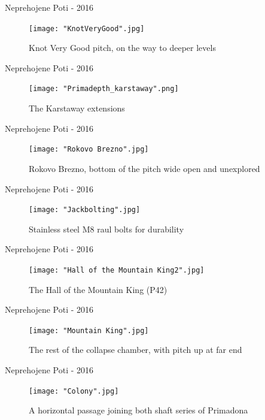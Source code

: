 \documentclass[10pt]{beamer}
\begin{document}
\begin{frame}{Neprehojene Poti - 2016}
    \begin{figure}[!ht]
    \centering
    \texttt{[image: "KnotVeryGood".jpg]}
    \caption{Knot Very Good pitch, on the way to deeper levels}
    \end{figure}
\end{frame} 

\begin{frame}{Neprehojene Poti - 2016}
    \begin{figure}[!ht]
    \centering
    \texttt{[image: "Primadepth\_karstaway".png]}
    \caption{The Karstaway extensions}
    \end{figure}
\end{frame} 
\begin{frame}{Neprehojene Poti - 2016}
    \begin{figure}[!ht]
    \centering
    \texttt{[image: "Rokovo Brezno".jpg]}
    \caption{Rokovo Brezno, bottom of the pitch wide open and unexplored}
    \end{figure}
\end{frame} 

    \begin{frame}{Neprehojene Poti - 2016}
    \begin{figure}[!ht]
    \centering
    \texttt{[image: "Jackbolting".jpg]}
    \caption{Stainless steel M8 raul bolts for durability}
    \end{figure}
\end{frame} 

\begin{frame}{Neprehojene Poti - 2016}
    \begin{figure}[!ht]
    \texttt{[image: "Hall of the Mountain King2".jpg]}
    \caption{The Hall of the Mountain King (P42)}
    \end{figure}
\end{frame} 

\begin{frame}{Neprehojene Poti - 2016}
    \begin{figure}[!ht]
    \centering
    \texttt{[image: "Mountain King".jpg]}
    \caption{The rest of the collapse chamber, with pitch up at far end}
    \end{figure}
\end{frame} 

\begin{frame}{Neprehojene Poti - 2016}
    \begin{figure}[!ht]
    \centering
    \texttt{[image: "Colony".jpg]}
    \caption{A horizontal passage joining both shaft series of Primadona}
    \end{figure}
\end{frame} 
\end{document}
